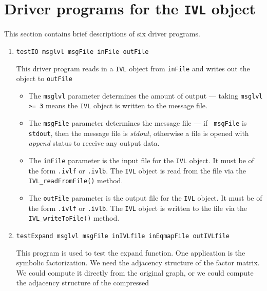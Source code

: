 \par
\section{Driver programs for the {\tt IVL} object}
\label{section:IVL:drivers}
\par
This section contains brief descriptions of six driver programs.
\par
\begin{enumerate}
\item
\begin{verbatim}
testIO msglvl msgFile inFile outFile
\end{verbatim}
This driver program reads in a {\tt IVL} object from {\tt inFile}
and writes out the object to {\tt outFile}
\par
\begin{itemize}
\item
The {\tt msglvl} parameter determines the amount of output ---
taking {\tt msglvl >= 3} means the {\tt IVL} object is written
to the message file.
\item
The {\tt msgFile} parameter determines the message file --- if {\tt
msgFile} is {\tt stdout}, then the message file is {\it stdout},
otherwise a file is opened with {\it append} status to receive any
output data.
\item
The {\tt inFile} parameter is the input file for the {\tt IVL}
object. It must be of the form {\tt *.ivlf} or {\tt *.ivlb}.
The {\tt IVL} object is read from the file via the
{\tt IVL\_readFromFile()} method.
\item
The {\tt outFile} parameter is the output file for the {\tt IVL}
object. It must be of the form {\tt *.ivlf} or {\tt *.ivlb}.
The {\tt IVL} object is written to the file via the
{\tt IVL\_writeToFile()} method.
\end{itemize}
\item
\begin{verbatim}
testExpand msglvl msgFile inIVLfile inEqmapFile outIVLfile
\end{verbatim}
This program is used to test the expand function.
One application is the symbolic factorization.
We need the adjacency structure of the factor matrix.
We could compute it directly from the original graph,
or we could compute the adjacency structure of the compressed

\end{enumerate}

